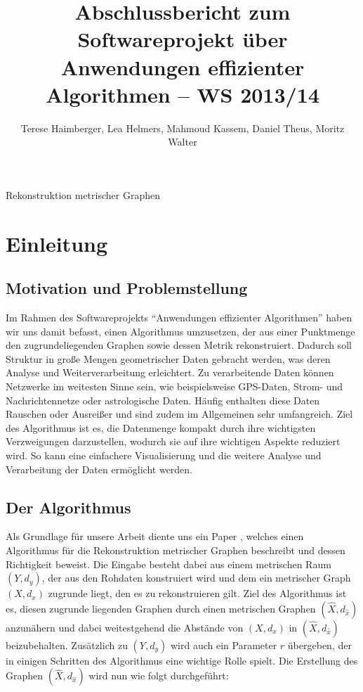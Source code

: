 \documentclass[parskip=half,
 fontsize=12pt, bibtotoc,
 ngerman]
 {article}
\author{Terese Haimberger, Lea Helmers, Mahmoud Kassem, Daniel Theus, Moritz Walter}
\title{Abschlussbericht zum Softwareprojekt über Anwendungen effizienter Algorithmen -- WS 2013/14}
\date{}
\begin{document}
\thispagestyle{empty}
\maketitle
\begin{center}
\begin{Huge}
Rekonstruktion metrischer Graphen
\end{Huge}
\end{center}
\newpage
\thispagestyle{empty}
\tableofcontents
\newpage
\onehalfspacing
\section{Einleitung}
\subsection{Motivation und Problemstellung}
Im Rahmen des Softwareprojekts "`Anwendungen effizienter Algorithmen"' haben wir uns damit befasst, einen Algorithmus umzusetzen, der aus einer Punktmenge den zugrundeliegenden Graphen sowie dessen Metrik rekonstruiert. Dadurch soll Struktur in gro{\ss}e Mengen geometrischer Daten gebracht werden, was deren Analyse und Weiterverarbeitung erleichtert. Zu verarbeitende Daten können Netzwerke im weitesten Sinne sein, wie beispielsweise GPS-Daten, Strom- und Nachrichtennetze oder astrologische Daten. Häufig enthalten diese Daten Rauschen oder Ausreißer und sind zudem im Allgemeinen sehr umfangreich. Ziel des Algorithmus ist es, die Datenmenge kompakt durch ihre wichtigsten Verzweigungen darzustellen, wodurch sie auf ihre wichtigen Aspekte reduziert wird. So kann eine einfachere Visualisierung und die weitere Analyse und Verarbeitung der Daten ermöglicht werden.
\subsection{Der Algorithmus}
Als Grundlage für unsere Arbeit diente uns ein Paper \cite{chenEa2012}, welches einen Algorithmus für die Rekonstruktion metrischer Graphen beschreibt und dessen Richtigkeit beweist. Die Eingabe besteht dabei aus einem metrischen Raum $\left(Y, d_y\right)$, der aus den Rohdaten konstruiert wird und dem ein metrischer Graph $\left(X, d_x\right)$ zugrunde liegt, den es zu rekonstruieren gilt. Ziel des Algorithmus ist es, diesen zugrunde liegenden Graphen durch einen metrischen Graphen $(\hat{X}, d_{\hat{x}})$ anzunähern und dabei weitestgehend die Abstände von $\left(X, d_x\right)$ in $(\hat{X}, d_{\hat{x}})$ beizubehalten. Zusätzlich zu $\left(Y, d_y\right)$ wird auch ein Parameter $r$ übergeben, der in einigen Schritten des Algorithmus eine wichtige Rolle spielt. Die Erstellung des Graphen $(\hat{X}, d_{\hat{x}})$ wird nun wie folgt durchgeführt:\newline
\end{document}
